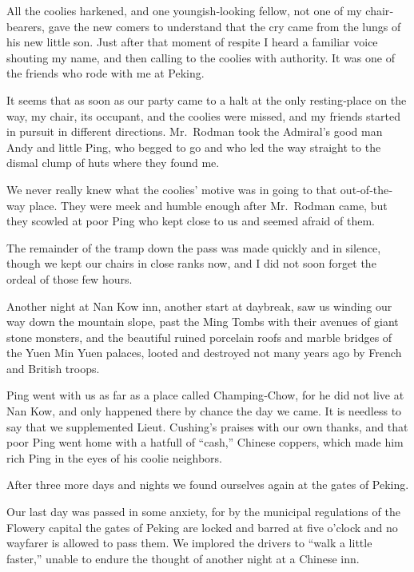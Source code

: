 \documentclass[12pt]{book}
\begin{document}
All the coolies harkened, and one youngish‐looking fellow, not one of my
chair‐bearers, gave the new comers to understand that the cry came from the
lungs of his new little son. Just after that moment of respite I heard a familiar
voice shouting my name, and then calling to the coolies with authority. It was
one of the friends who rode with me at Peking.

It seems that as soon as our party came to a halt at the only resting‐place
on the way, my chair, its occupant, and the coolies were missed, and my friends
started in pursuit in different directions. Mr.~Rodman took the Admiral’s good
man Andy and little Ping, who begged to go and who led the way straight to the
dismal clump of huts where they found me.

We never really knew what the coolies’ motive was in going to that out‐of‐the‐way
place. They were meek and humble enough after Mr.~Rodman came, but they
scowled at poor Ping who kept close to us and seemed afraid of them.

The remainder of the tramp down the pass was made quickly and in silence,
though we kept our chairs in close ranks now, and I did not soon forget the ordeal
of those few hours.

Another night at Nan Kow inn, another start at daybreak, saw us winding our
way down the mountain slope, past the Ming Tombs with their avenues of giant
stone monsters, and the beautiful ruined porcelain roofs and marble bridges of
the Yuen Min Yuen palaces, looted and destroyed not many years ago by French
and British troops.

Ping went with us as far as a place called Champing‐Chow, for he did not live
at Nan Kow, and only happened there by chance the day we came. It is needless
to say that we supplemented Lieut. Cushing’s praises with our own thanks, and
that poor Ping went home with a hatfull of “cash,” Chinese coppers, which made
him rich Ping in the eyes of his coolie neighbors.

After three more days and nights we found ourselves again at the gates of
Peking.

Our last day was passed in some anxiety, for by the municipal regulations of
the Flowery capital the gates of Peking are locked and barred at five o’clock and
no wayfarer is allowed to pass them. We implored the drivers to “walk a little
faster,” unable to endure the thought of another night at a Chinese inn.
\end{document}
